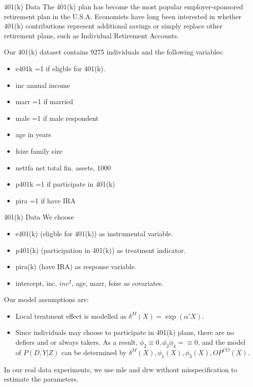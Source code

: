 \documentclass[aspectratio=169,xcolor=dvipsnames]{beamer}
\begin{document}
\begin{frame}{401(k) Data}
The 401(k) plan has become the most popular employer-sponsored retirement plan in the U.S.A. Economists have long been interested in whether 401(k) contributions represent additional savings or simply replace other retirement plans, such as Individual Retirement Accounts.

Our 401(k) dataset contains 9275 individuals and the following variables:
\begin{itemize}
\item e401k                        =1 if eligble for 401(k).
\item inc                          annual income
\item marr                         =1 if married 
\item male                         =1 if male respondent 
\item age                          in years 
\item fsize                        family size  
\item nettfa                       net total fin. assets, 1000
\item p401k                        =1 if participate in 401(k) 
\item pira                         =1 if have IRA 
\end{itemize}
\end{frame}

\begin{frame}{401(k) Data}
We choose 
\begin{itemize}
\item e401(k) (eligble for 401(k)) as instrumental variable.
\item p401(k) (participation in 401(k)) as treatment indicator.
\item pira(k) (have IRA) as response variable.
\item intercept, inc, $inc^2$, age, marr, fsize as covariates.
\end{itemize}

Our model assumptions are:
\begin{itemize}
\item Local treatment effect is modelled as $\delta^M(X) = \exp(\alpha'X)$.
\item Since individuals may choose to participate in 401(k) plans, there are no defiers and or always takers. As a result, $\phi_2\equiv 0, \phi_2\phi_4=\equiv 0$, and the model of $P(D,Y|Z)$ can be determined by $\delta^M(X), \phi_1(X),\phi_3(X), OP^{CO}(X)$.
\end{itemize}
In our real data experiments, we use mle and drw without misspecification to estimate the parameters.
\end{frame}
\end{document}

